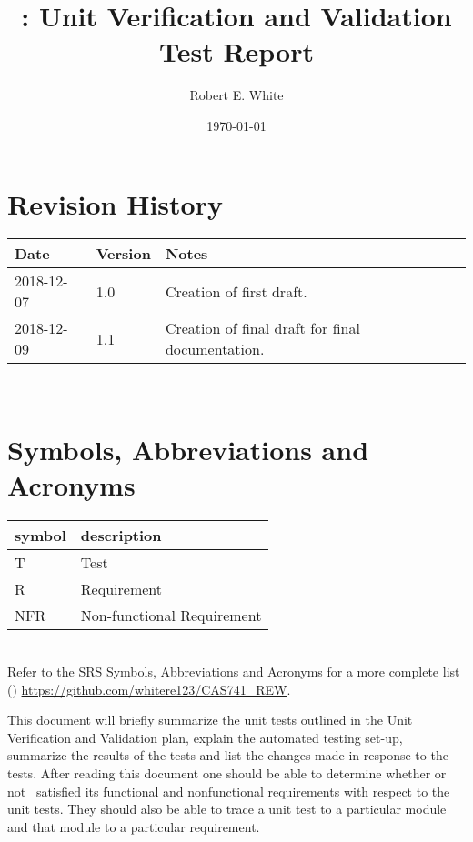 \documentclass[12pt, titlepage]{article}
\begin{document}
\title{\progname: Unit Verification and Validation Test Report} 
\author{Robert E. White}
\date{\today}
	
\maketitle


\section{Revision History}

\begin{tabularx}{\textwidth}{p{3cm}p{2cm}X}
\toprule {\bf Date} & {\bf Version} & {\bf Notes}\\
\midrule
2018-12-07 & 1.0 & Creation of first draft.\\
2018-12-09 & 1.1 & Creation of final draft for final documentation. \\
\bottomrule
\end{tabularx}

~\newpage

\section{Symbols, Abbreviations and Acronyms}

\renewcommand{\arraystretch}{1.2}
\begin{tabular}{l l} 
	\toprule		
	\textbf{symbol} & \textbf{description}\\
	\midrule 
	T & Test\\
	R & Requirement\\ 
	NFR & Non-functional Requirement\\
	\bottomrule
\end{tabular}\\

Refer to the SRS Symbols, Abbreviations and Acronyms for a more 
complete list (\cite{SRS}) \url{https://github.com/whitere123/CAS741_REW}. 

\newpage

\tableofcontents

\listoftables %

\listoffigures %

\newpage


This document will briefly summarize the unit tests outlined in the Unit 
Verification and Validation plan, explain the automated testing set-up, 
summarize the results of the tests and list the changes made in response to the 
tests. After reading this document one should be able to determine whether or 
not \progname \ satisfied its functional and nonfunctional requirements with 
respect to the unit tests. They should also be able to trace a unit test to a 
particular module and that module to a particular requirement. 
\end{document}
